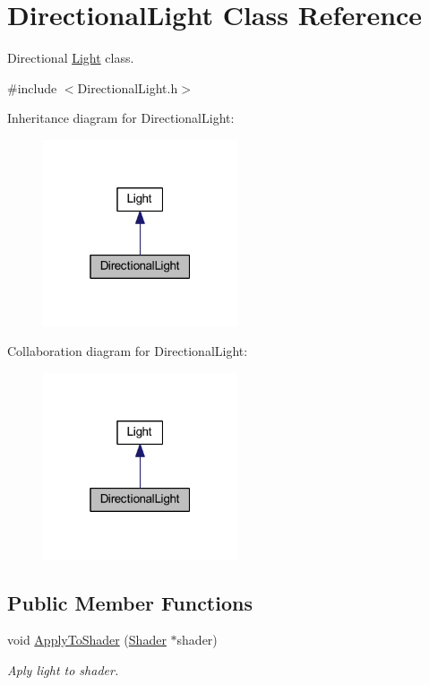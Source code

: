 \hypertarget{class_directional_light}{}\section{Directional\+Light Class Reference}
\label{class_directional_light}


Directional \mbox{\hyperlink{class_light}{Light}} class.  




{\ttfamily \#include $<$Directional\+Light.\+h$>$}



Inheritance diagram for Directional\+Light\+:
\nopagebreak
\begin{figure}[H]
\begin{center}
\leavevmode
\includegraphics[width=163pt]{class_directional_light__inherit__graph}
\end{center}
\end{figure}


Collaboration diagram for Directional\+Light\+:
\nopagebreak
\begin{figure}[H]
\begin{center}
\leavevmode
\includegraphics[width=163pt]{class_directional_light__coll__graph}
\end{center}
\end{figure}
\subsection*{Public Member Functions}
\begin{DoxyCompactItemize}
\item 
void \mbox{\hyperlink{class_directional_light_a258c15fc957f8ffb76161dc000830418}{Apply\+To\+Shader}} (\mbox{\hyperlink{class_shader}{Shader}} $\ast$shader)
\begin{DoxyCompactList}\small\item\em Aply light to shader. \end{DoxyCompactList}\end{DoxyCompactItemize}
